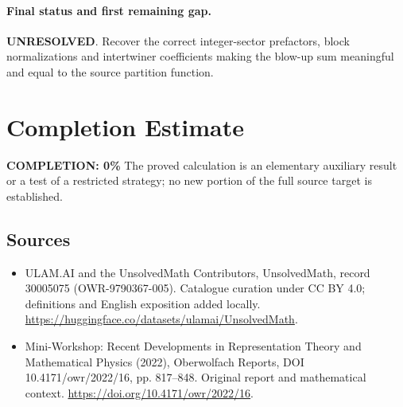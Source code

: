 \documentclass[11pt]{article}
\begin{document}
\paragraph{Final status and first remaining gap.}
\textbf{UNRESOLVED}. Recover the correct integer-sector prefactors, block normalizations and intertwiner coefficients making the blow-up sum meaningful and equal to the source partition function.

\section{Completion Estimate}
\noindent\textbf{COMPLETION: 0\%}
The proved calculation is an elementary auxiliary result or a test of a restricted strategy; no new portion of the full source target is established.

\subsection{Sources}
\begin{itemize}
\item[\hypertarget{source:30005075:1}{S1}] ULAM.AI and the UnsolvedMath Contributors, UnsolvedMath, record 30005075 (OWR-9790367-005). Catalogue curation under CC BY 4.0; definitions and English exposition added locally.
\url{https://huggingface.co/datasets/ulamai/UnsolvedMath}.
\item[\hypertarget{source:30005075:2}{S2}] Mini-Workshop: Recent Developments in Representation Theory and Mathematical Physics (2022), Oberwolfach Reports, DOI 10.4171/owr/2022/16, pp. 817--848. Original report and mathematical context.
\url{https://doi.org/10.4171/owr/2022/16}.
\end{itemize}
\label{end:30005075}
\end{document}
